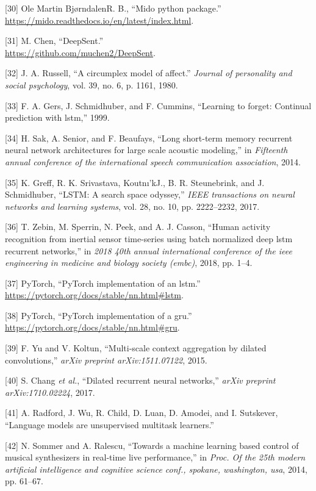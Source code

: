 \documentclass[12pt,]{article}
\begin{document}
\leavevmode\hypertarget{ref-mido}{}%
{[}30{]} Ole Martin BjørndalenR. B., ``Mido python package.'' \\
\url{https://mido.readthedocs.io/en/latest/index.html}.

\leavevmode\hypertarget{ref-deepsent}{}%
{[}31{]} M. Chen, ``DeepSent.'' \\
\url{https://github.com/muchen2/DeepSent}.

\leavevmode\hypertarget{ref-russell1980circumplex}{}%
{[}32{]} J. A. Russell, ``A circumplex model of affect.'' \emph{Journal
of personality and social psychology}, vol. 39, no. 6, p. 1161, 1980.

\leavevmode\hypertarget{ref-gers1999learning}{}%
{[}33{]} F. A. Gers, J. Schmidhuber, and F. Cummins, ``Learning to
forget: Continual prediction with lstm,'' 1999.

\leavevmode\hypertarget{ref-sak2014long}{}%
{[}34{]} H. Sak, A. Senior, and F. Beaufays, ``Long short-term memory
recurrent neural network architectures for large scale acoustic
modeling,'' in \emph{Fifteenth annual conference of the international
speech communication association}, 2014.

\leavevmode\hypertarget{ref-greff2017lstm}{}%
{[}35{]} K. Greff, R. K. Srivastava, Koutnı'kJ., B. R. Steunebrink, and
J. Schmidhuber, ``LSTM: A search space odyssey,'' \emph{IEEE
transactions on neural networks and learning systems}, vol. 28, no. 10,
pp. 2222--2232, 2017.

\leavevmode\hypertarget{ref-zebin2018human}{}%
{[}36{]} T. Zebin, M. Sperrin, N. Peek, and A. J. Casson, ``Human
activity recognition from inertial sensor time-series using batch
normalized deep lstm recurrent networks,'' in \emph{2018 40th annual
international conference of the ieee engineering in medicine and biology
society (embc)}, 2018, pp. 1--4.

\leavevmode\hypertarget{ref-pytorchlstm}{}%
{[}37{]} \relax PyTorch, ``PyTorch implementation of an lstm.'' \\
\url{https://pytorch.org/docs/stable/nn.html\#lstm}.

\leavevmode\hypertarget{ref-pytorchgru}{}%
{[}38{]} \relax PyTorch, ``PyTorch implementation of a gru.'' \\
\url{https://pytorch.org/docs/stable/nn.html\#gru}.

\leavevmode\hypertarget{ref-yu2015multi}{}%
{[}39{]} F. Yu and V. Koltun, ``Multi-scale context aggregation by
dilated convolutions,'' \emph{arXiv preprint arXiv:1511.07122}, 2015.

\leavevmode\hypertarget{ref-chang2017dilated}{}%
{[}40{]} S. Chang \emph{et al.}, ``Dilated recurrent neural networks,''
\emph{arXiv preprint arXiv:1710.02224}, 2017.

\leavevmode\hypertarget{ref-radford2018language}{}%
{[}41{]} A. Radford, J. Wu, R. Child, D. Luan, D. Amodei, and I.
Sutskever, ``Language models are unsupervised multitask learners.''

\leavevmode\hypertarget{ref-sommer2014towards}{}%
{[}42{]} N. Sommer and A. Ralescu, ``Towards a machine learning based
control of musical synthesizers in real-time live performance,'' in
\emph{Proc. Of the 25th modern artificial intelligence and cognitive
science conf., spokane, washington, usa}, 2014, pp. 61--67.
\end{document}
